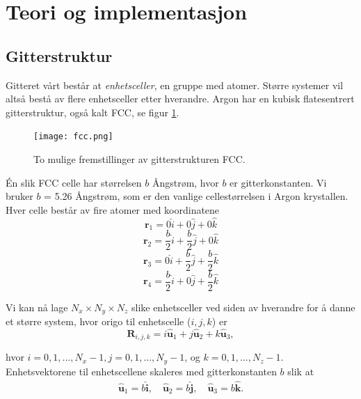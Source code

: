 \documentclass[paper=a4, fontsize=11pt]{scrartcl} %
\numberwithin{equation}{section} %
\numberwithin{figure}{section} %
\numberwithin{table}{section} %
\begin{document}
\section{Teori og implementasjon}

\subsection{Gitterstruktur}
Gitteret vårt består at \textit{enhetsceller}, en gruppe med atomer. Større systemer vil altså bestå av flere enhetsceller etter hverandre. Argon har en kubisk flatesentrert gitterstruktur, også kalt FCC, se figur \ref{fcc}. 

\FloatBarrier
\begin{figure}[!ht]
 \centering
 \texttt{[image: fcc.png]}
 \caption{To mulige fremstillinger av gitterstrukturen FCC.}
 \label{fcc}
 \end{figure}
 \FloatBarrier

Én slik FCC celle har størrelsen $b$ Ångstrøm, hvor $b$ er gitterkonstanten. Vi bruker $b$ = 5.26 Ångstrøm, som er den vanlige cellestørrelsen i Argon krystallen. Hver celle består av fire atomer med koordinatene
\begin{equation}
\textbf{r}_1 = 0 \hat{i} + 0 \hat{j} + 0 \hat{k}
\end{equation}
\begin{equation}
\textbf{r}_2 = \frac{b}{2} \hat{i} + \frac{b}{2} \hat{j} + 0 \hat{k}
\end{equation}
\begin{equation}
\textbf{r}_3 = 0 \hat{i} + \frac{b}{2} \hat{j} + \frac{b}{2} \hat{k}
\end{equation}
\begin{equation}
\textbf{r}_4 = \frac{b}{2} \hat{i} + 0 \hat{j} + \frac{b}{2} \hat{k}
\end{equation}

Vi kan nå lage $N_x \times N_y \times N_z$ slike enhetsceller ved siden av hverandre for å danne et større system, hvor origo til enhetscelle ($i,j,k$) er 
\begin{equation}
\mathbf{R}_{i,j,k} = i \hat{\mathbf{u}}_1 + j \hat{\mathbf{u}}_2 + k \hat{\mathbf{u}}_3,
\end{equation}

hvor $i=0,1,..., N_x-1, j=0,1,..., N_y-1$, og $k=0,1,..., N_z-1$. Enhetsvektorene til enhetscellene skaleres med gitterkonstanten $b$ slik at
\begin{align}
	\hat{\mathbf{u}}_1 = b\hat{\mathbf{i}}, \quad \hat{\mathbf{u}}_2 = b\hat{\mathbf{j}}, \quad \hat{\mathbf{u}}_3 = b\hat{\mathbf{k}}.
\end{align}
\end{document}
